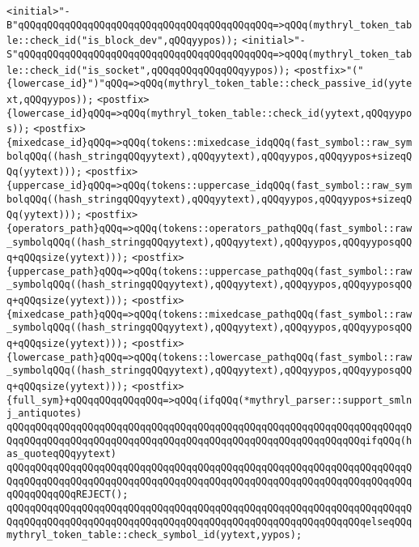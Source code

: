\verb|<initial>"-B"qQQqqQQqqQQqqQQqqQQqqQQqqQQqqQQqqQQqqQQqqQQq=>qQQq(mythryl_token_table::check_id("is_block_dev",qQQqyypos));|\newline
\verb|<initial>"-S"qQQqqQQqqQQqqQQqqQQqqQQqqQQqqQQqqQQqqQQqqQQq=>qQQq(mythryl_token_table::check_id("is_socket",qQQqqQQqqQQqqQQqyypos));|\newline
\verb|<postfix>"("{lowercase_id}")"qQQq=>qQQq(mythryl_token_table::check_passive_id(yytext,qQQqyypos));|\newline
\verb|<postfix>{lowercase_id}qQQq=>qQQq(mythryl_token_table::check_id(yytext,qQQqyypos));|\newline
\verb|<postfix>{mixedcase_id}qQQq=>qQQq(tokens::mixedcase_idqQQq(fast_symbol::raw_symbolqQQq((hash_stringqQQqyytext),qQQqyytext),qQQqyypos,qQQqyypos+sizeqQQq(yytext)));|\newline
\verb|<postfix>{uppercase_id}qQQq=>qQQq(tokens::uppercase_idqQQq(fast_symbol::raw_symbolqQQq((hash_stringqQQqyytext),qQQqyytext),qQQqyypos,qQQqyypos+sizeqQQq(yytext)));|\newline
\verb|<postfix>{operators_path}qQQq=>qQQq(tokens::operators_pathqQQq(fast_symbol::raw_symbolqQQq((hash_stringqQQqyytext),qQQqyytext),qQQqyypos,qQQqyyposqQQq+qQQqsize(yytext)));|\newline
\verb|<postfix>{uppercase_path}qQQq=>qQQq(tokens::uppercase_pathqQQq(fast_symbol::raw_symbolqQQq((hash_stringqQQqyytext),qQQqyytext),qQQqyypos,qQQqyyposqQQq+qQQqsize(yytext)));|\newline
\verb|<postfix>{mixedcase_path}qQQq=>qQQq(tokens::mixedcase_pathqQQq(fast_symbol::raw_symbolqQQq((hash_stringqQQqyytext),qQQqyytext),qQQqyypos,qQQqyyposqQQq+qQQqsize(yytext)));|\newline
\verb|<postfix>{lowercase_path}qQQq=>qQQq(tokens::lowercase_pathqQQq(fast_symbol::raw_symbolqQQq((hash_stringqQQqyytext),qQQqyytext),qQQqyypos,qQQqyyposqQQq+qQQqsize(yytext)));|\newline
\verb|<postfix>{full_sym}+qQQqqQQqqQQqqQQq=>qQQq(ifqQQq(*mythryl_parser::support_smlnj_antiquotes)|\newline
\verb|qQQqqQQqqQQqqQQqqQQqqQQqqQQqqQQqqQQqqQQqqQQqqQQqqQQqqQQqqQQqqQQqqQQqqQQqqQQqqQQqqQQqqQQqqQQqqQQqqQQqqQQqqQQqqQQqqQQqqQQqqQQqqQQqqQQqifqQQq(has_quoteqQQqyytext)|\newline
\verb|qQQqqQQqqQQqqQQqqQQqqQQqqQQqqQQqqQQqqQQqqQQqqQQqqQQqqQQqqQQqqQQqqQQqqQQqqQQqqQQqqQQqqQQqqQQqqQQqqQQqqQQqqQQqqQQqqQQqqQQqqQQqqQQqqQQqqQQqqQQqqQQqqQQqqQQqREJECT();|\newline
\verb|qQQqqQQqqQQqqQQqqQQqqQQqqQQqqQQqqQQqqQQqqQQqqQQqqQQqqQQqqQQqqQQqqQQqqQQqqQQqqQQqqQQqqQQqqQQqqQQqqQQqqQQqqQQqqQQqqQQqqQQqqQQqqQQqqQQqelseqQQqmythryl_token_table::check_symbol_id(yytext,yypos);|\newline
